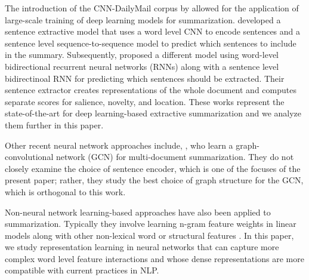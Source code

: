 
The introduction of the CNN-DailyMail corpus by \citet{nips15_hermann} 
allowed for the application of large-scale training of deep learning models for summarization.
\citet{cheng2016neural} %
developed a sentence extractive
model that uses a word level 
CNN to encode 
sentences and a sentence level sequence-to-sequence model to predict 
which sentences to include in the summary. Subsequently, 
\citet{nallapati2017summarunner}
proposed a different model using word-level bidirectional recurrent neural 
networks (RNNs) along with a sentence level bidirectinoal RNN for 
predicting which sentences should be extracted. 
Their sentence
extractor creates representations of the whole document and computes 
separate scores for salience, novelty, and location.
These works represent the state-of-the-art for deep learning-based extractive
summarization and we analyze them further in this paper.

Other recent neural network approaches include, \citet{yasunaga2017graph},
who learn a graph-convolutional network (GCN) for multi-document summarization.
They do not 
closely examine the choice of sentence encoder, which is one of the focuses
of the present paper; rather, they study the best choice of graph 
structure for the GCN, which is orthogonal to this work. 

Non-neural network learning-based approaches have also been applied
to summarization. Typically they involve learning n-gram feature weights 
in linear models along with other non-lexical word or 
structural features 
\cite{berg2011jointly,sipos2012large,durrett2016learning}.
In this paper, we study representation learning in
neural networks that can capture more complex word level feature interactions
and whose dense representations are more compatible with current practices
in NLP.







